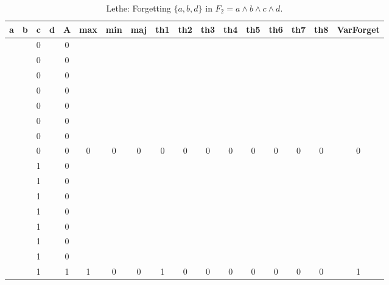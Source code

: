 \begin{table}[!tb]
    \centering
    \begin{tabular}{|c|c|c|c|c|c|c|c|c|c|c|c|c|c|c|c|c|}
        \hline
        \textbf{a} & \textbf{b} & \textbf{c} & \textbf{d} & \textbf{A} & \textbf{max} & \textbf{min} & \textbf{maj} & \textbf{th1} & \textbf{th2} & \textbf{th3} & \textbf{th4} & \textbf{th5} & \textbf{th6} & \textbf{th7} & \textbf{th8} & \textbf{VarForget} \\ \hline
        \rowcolor{gray!40}  &  & 0 &  & 0 &  &  &  &  &  &  &  &  &  &  &  &  \\ \hline
        \rowcolor{gray!40}  &  & 0 &  & 0 &  &  &  &  &  &  &  &  &  &  &  &  \\ \hline
        \rowcolor{gray!40}  &  & 0 &  & 0 &  &  &  &  &  &  &  &  &  &  &  &  \\ \hline
        \rowcolor{gray!40}  &  & 0 &  & 0 &  &  &  &  &  &  &  &  &  &  &  &  \\ \hline
        \rowcolor{gray!40}  &  & 0 &  & 0 &  &  &  &  &  &  &  &  &  &  &  &  \\ \hline
        \rowcolor{gray!40}  &  & 0 &  & 0 &  &  &  &  &  &  &  &  &  &  &  &  \\ \hline
        \rowcolor{gray!40}  &  & 0 &  & 0 &  &  &  &  &  &  &  &  &  &  &  &  \\ \hline
        \rowcolor{gray!40}  &  & 0 &  & 0 & 0 & 0 & 0 & 0 & 0 & 0 & 0 & 0 & 0 & 0 & 0 & 0 \\ \hline
        \rowcolor{blue!40}  &  & 1 &  & 0 &  &  &  &  &  &  &  &  &  &  &  &  \\ \hline
        \rowcolor{blue!40}  &  & 1 &  & 0 &  &  &  &  &  &  &  &  &  &  &  &  \\ \hline
        \rowcolor{blue!40}  &  & 1 &  & 0 &  &  &  &  &  &  &  &  &  &  &  &  \\ \hline
        \rowcolor{blue!40}  &  & 1 &  & 0 &  &  &  &  &  &  &  &  &  &  &  &  \\ \hline
        \rowcolor{blue!40}  &  & 1 &  & 0 &  &  &  &  &  &  &  &  &  &  &  &  \\ \hline
        \rowcolor{blue!40}  &  & 1 &  & 0 &  &  &  &  &  &  &  &  &  &  &  &  \\ \hline
        \rowcolor{blue!40}  &  & 1 &  & 0 &  &  &  &  &  &  &  &  &  &  &  &  \\ \hline
        \rowcolor{blue!40}  &  & 1 &  & 1 & 1 & 0 & 0 & 1 & 0 & 0 & 0 & 0 & 0 & 0 & 0 & 1 \\ \hline
    \end{tabular}
    \caption{Lethe: Forgetting $\{a, b, d\}$ in $F_{2} = a \land b \land c \land d$.}
    \label{tab:lethe-F2-abd}
\end{table}

